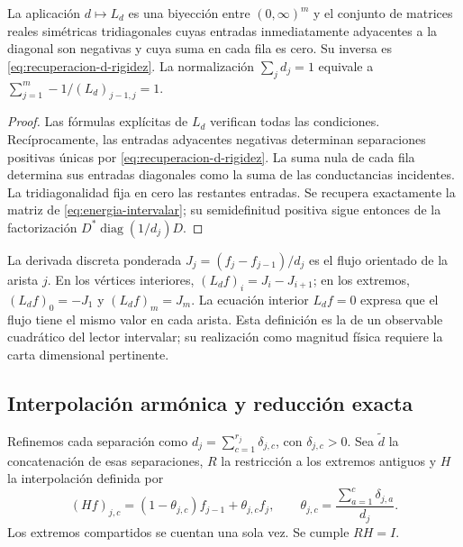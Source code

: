 \begin{proposition}
\label{prop:energia-bidireccional}
La aplicación \(d\mapsto L_d\) es una biyección entre
\((0,\infty)^m\) y el conjunto de matrices reales simétricas
tridiagonales cuyas entradas inmediatamente adyacentes a la diagonal son
negativas y cuya suma en cada fila es cero. Su inversa es
\eqref{eq:recuperacion-d-rigidez}. La normalización \(\sum_jd_j=1\)
equivale a \(\sum_{j=1}^m-1/(L_d)_{j-1,j}=1\).
\end{proposition}
\begin{proof}
Las fórmulas explícitas de \(L_d\) verifican todas las condiciones.
Recíprocamente, las entradas adyacentes negativas determinan separaciones
positivas únicas por \eqref{eq:recuperacion-d-rigidez}. La suma nula de
cada fila determina sus entradas diagonales como la suma de las
conductancias incidentes. La tridiagonalidad fija en cero las restantes
entradas. Se recupera exactamente la matriz de
\eqref{eq:energia-intervalar}; su semidefinitud positiva sigue entonces
de la factorización \(D^*\operatorname{diag}(1/d_j)D\).
\end{proof}

La derivada discreta ponderada
\(J_j=(f_j-f_{j-1})/d_j\) es el flujo orientado de la arista \(j\).
En los vértices interiores, \((L_df)_i=J_i-J_{i+1}\); en los extremos,
\((L_df)_0=-J_1\) y \((L_df)_m=J_m\). La ecuación interior
\(L_df=0\) expresa que el flujo tiene el mismo valor en cada arista.
Esta definición es la de un observable cuadrático del lector intervalar;
su realización como magnitud física requiere la carta dimensional pertinente.

\subsection{Interpolación armónica y reducción exacta}

Refinemos cada separación como
\(d_j=\sum_{c=1}^{r_j}\delta_{j,c}\), con \(\delta_{j,c}>0\).
Sea \(\widetilde d\) la concatenación de esas separaciones, \(R\) la
restricción a los extremos antiguos y \(H\) la interpolación definida por
\begin{equation}
 (Hf)_{j,c}=(1-\theta_{j,c})f_{j-1}+\theta_{j,c}f_j,
 \qquad
 \theta_{j,c}=\frac{\sum_{a=1}^c\delta_{j,a}}{d_j}.
 \label{eq:interpolacion-armonica-k}
\end{equation}
Los extremos compartidos se cuentan una sola vez. Se cumple \(RH=I\).

